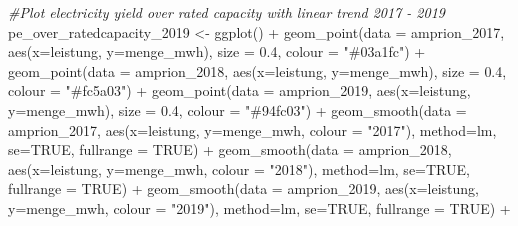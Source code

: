\documentclass[a4paper,11pt]{article}
\newenvironment{Shaded}{\begin{snugshade}}{\end{snugshade}}
\newcommand{\AttributeTok}[1]{\textcolor[rgb]{0.77,0.63,0.00}{#1}}
\newcommand{\CommentTok}[1]{\textcolor[rgb]{0.56,0.35,0.01}{\textit{#1}}}
\newcommand{\ConstantTok}[1]{\textcolor[rgb]{0.00,0.00,0.00}{#1}}
\newcommand{\FloatTok}[1]{\textcolor[rgb]{0.00,0.00,0.81}{#1}}
\newcommand{\FunctionTok}[1]{\textcolor[rgb]{0.00,0.00,0.00}{#1}}
\newcommand{\NormalTok}[1]{#1}
\newcommand{\OtherTok}[1]{\textcolor[rgb]{0.56,0.35,0.01}{#1}}
\newcommand{\SpecialCharTok}[1]{\textcolor[rgb]{0.00,0.00,0.00}{#1}}
\newcommand{\StringTok}[1]{\textcolor[rgb]{0.31,0.60,0.02}{#1}}
\begin{document}
\begin{Shaded}
\begin{Highlighting}[]
\CommentTok{\#Plot electricity yield over rated capacity with linear trend 2017 {-} 2019}
\NormalTok{pe\_over\_ratedcapacity\_2019 }\OtherTok{\textless{}{-}} \FunctionTok{ggplot}\NormalTok{() }\SpecialCharTok{+}
  \FunctionTok{geom\_point}\NormalTok{(}\AttributeTok{data =}\NormalTok{ amprion\_2017, }\FunctionTok{aes}\NormalTok{(}\AttributeTok{x=}\NormalTok{leistung, }\AttributeTok{y=}\NormalTok{menge\_mwh), }
             \AttributeTok{size =} \FloatTok{0.4}\NormalTok{, }\AttributeTok{colour =} \StringTok{"\#03a1fc"}\NormalTok{) }\SpecialCharTok{+}
  \FunctionTok{geom\_point}\NormalTok{(}\AttributeTok{data =}\NormalTok{ amprion\_2018, }\FunctionTok{aes}\NormalTok{(}\AttributeTok{x=}\NormalTok{leistung, }\AttributeTok{y=}\NormalTok{menge\_mwh), }
             \AttributeTok{size =} \FloatTok{0.4}\NormalTok{, }\AttributeTok{colour =} \StringTok{"\#fc5a03"}\NormalTok{) }\SpecialCharTok{+}
  \FunctionTok{geom\_point}\NormalTok{(}\AttributeTok{data =}\NormalTok{ amprion\_2019, }\FunctionTok{aes}\NormalTok{(}\AttributeTok{x=}\NormalTok{leistung, }\AttributeTok{y=}\NormalTok{menge\_mwh), }
             \AttributeTok{size =} \FloatTok{0.4}\NormalTok{, }\AttributeTok{colour =} \StringTok{"\#94fc03"}\NormalTok{) }\SpecialCharTok{+}
  \FunctionTok{geom\_smooth}\NormalTok{(}\AttributeTok{data =}\NormalTok{ amprion\_2017, }
              \FunctionTok{aes}\NormalTok{(}\AttributeTok{x=}\NormalTok{leistung, }\AttributeTok{y=}\NormalTok{menge\_mwh, }\AttributeTok{colour =} \StringTok{"2017"}\NormalTok{), }
              \AttributeTok{method=}\NormalTok{lm, }\AttributeTok{se=}\ConstantTok{TRUE}\NormalTok{, }\AttributeTok{fullrange =} \ConstantTok{TRUE}\NormalTok{)  }\SpecialCharTok{+}
  \FunctionTok{geom\_smooth}\NormalTok{(}\AttributeTok{data =}\NormalTok{ amprion\_2018, }
              \FunctionTok{aes}\NormalTok{(}\AttributeTok{x=}\NormalTok{leistung, }\AttributeTok{y=}\NormalTok{menge\_mwh, }\AttributeTok{colour =} \StringTok{"2018"}\NormalTok{), }
              \AttributeTok{method=}\NormalTok{lm, }\AttributeTok{se=}\ConstantTok{TRUE}\NormalTok{, }\AttributeTok{fullrange =} \ConstantTok{TRUE}\NormalTok{)  }\SpecialCharTok{+}
  \FunctionTok{geom\_smooth}\NormalTok{(}\AttributeTok{data =}\NormalTok{ amprion\_2019, }
              \FunctionTok{aes}\NormalTok{(}\AttributeTok{x=}\NormalTok{leistung, }\AttributeTok{y=}\NormalTok{menge\_mwh, }\AttributeTok{colour =} \StringTok{"2019"}\NormalTok{), }
              \AttributeTok{method=}\NormalTok{lm, }\AttributeTok{se=}\ConstantTok{TRUE}\NormalTok{, }\AttributeTok{fullrange =} \ConstantTok{TRUE}\NormalTok{)  }\SpecialCharTok{+}

\end{Highlighting}
\end{Shaded}
\end{document}
